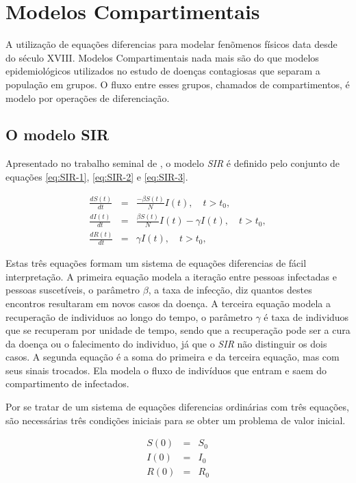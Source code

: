 
\chapter{Modelos Compartimentais}
\label{sec-modelos-compartimentais}

A utilização de equações diferencias para modelar fenõmenos físicos data desde do 
século XVIII. Modelos Compartimentais nada mais são do que modelos epidemiológicos
utilizados no estudo de doenças contagiosas que separam a população em grupos.
O fluxo entre esses grupos, chamados de compartimentos, é modelo por operações
de diferenciação.

\section{O modelo SIR}

Apresentado no trabalho seminal de \cite{kermack-mcKendrick:1927}, 
o modelo \textit{SIR} é definido pelo conjunto de equações \ref{eq:SIR-1}, 
\ref{eq:SIR-2} e \ref{eq:SIR-3}.

\begin{eqnarray}\label{eq:sir}
   \frac{dS(t)}{dt} &=& \frac{-\beta S(t)}{N} I(t),  \quad t > t_0, \label{eq:SIR-1}\\
   \frac{dI(t)}{dt} &=& \frac{\beta S(t)}{N} I(t) - \gamma I(t), \quad t > t_0, \label{eq:SIR-2}\\
   \frac{dR(t)}{dt} &=& \gamma I(t),  \quad t > t_0, \label{eq:SIR-3}
\end{eqnarray}

Estas três equações formam um sistema de equações diferencias de fácil interpretação.
A primeira equação modela a iteração entre pessoas infectadas e pessoas suscetíveis,
o parâmetro $\beta$, a taxa de infecção, diz quantos destes encontros resultaram 
em novos casos da doença. 
A terceira equação modela a recuperação de individuos ao
longo do tempo, o parâmetro $\gamma$ é taxa de individuos que se recuperam por 
unidade de tempo, sendo que a recuperação pode ser a cura da doença ou o falecimento
do individuo, já que o \textit{SIR} não distinguir os dois casos. 
A segunda equação é a soma do primeira e da terceira equação, mas com seus sinais
trocados. Ela modela o fluxo de indivíduos que entram e saem do compartimento
de infectados.  

Por se tratar de um sistema de equações diferencias ordinárias com três equações,
são necessárias três condições iniciais para se obter um problema de valor
inicial.

\begin{eqnarray}
   S(0) &=& S_0 \label{eq:SIR-S0}\\
   I(0) &=& I_0 \label{eq:SIR-I0}\\
   R(0) &=& R_0 \label{eq:SIR-R0}
\end{eqnarray}

